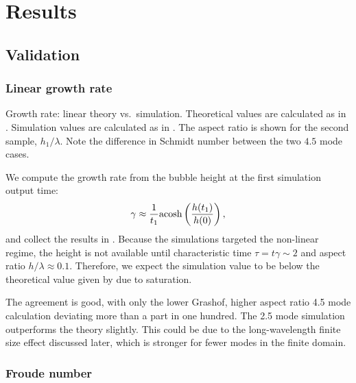 \section{Results} 

\subsection{Validation}

\subsubsection{Linear growth rate}

\begin{table}
\begin{center}

\end{center}
\caption{ 
Growth rate: linear theory vs.\ simulation.
Theoretical values are calculated as in .
Simulation values are calculated as in .
The aspect ratio is shown for the second sample, $h_1 / \lambda$.
Note the difference in Schmidt number between the two $4.5$ mode cases.
}
\end{table}

We compute the growth rate from the bubble height at the first simulation output time:
\begin{equation} \elabel{linear_sim}
\gamma \approx \frac{1}{t_1} \text{acosh}\left(\frac{h(t_1)}{h(0)}\right), 
\end{equation}
and collect the results in .
Because the simulations targeted the non-linear regime, the height is not available until characteristic time $\tau = t \gamma \sim 2$ and aspect ratio $h / \lambda \approx 0.1$.
Therefore, we expect the simulation value to be below the theoretical value given by  due to saturation.

The agreement is good, with only the lower Grashof, higher aspect ratio 4.5 mode calculation deviating more than a part in one hundred.
The 2.5 mode simulation outperforms the theory slightly.
This could be due to the long-wavelength finite size effect discussed later, which is stronger for fewer modes in the finite domain.

\subsubsection{Froude number}

